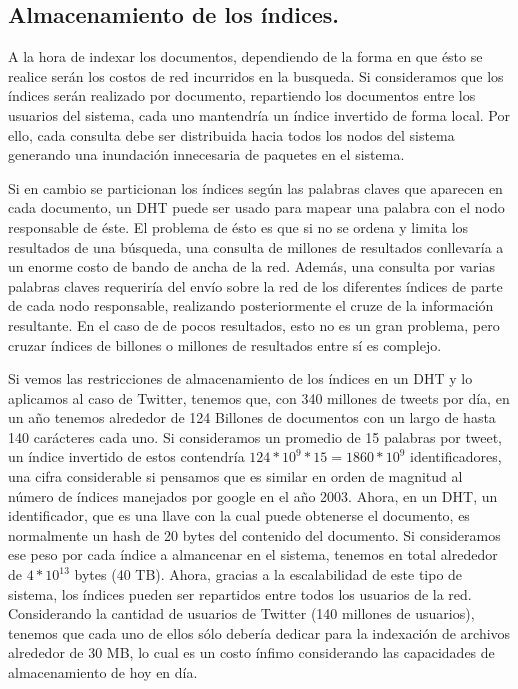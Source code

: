 %

\subsection{Almacenamiento de los índices.}
\label{sec:index_storage}
    

    A la hora de indexar los documentos, dependiendo de la forma en
    que ésto se realice serán los costos de red incurridos en la busqueda.
    Si consideramos que los índices serán realizado por documento, repartiendo
    los documentos entre los usuarios del sistema, cada uno mantendría un índice
    invertido de forma local. Por ello, cada consulta debe ser distribuida
    hacia todos los nodos del sistema generando una inundación innecesaria de paquetes en el sistema.
    
    Si en cambio se particionan los índices según las palabras claves que
    aparecen en cada documento, un DHT puede ser usado para mapear una palabra
    con el nodo responsable de éste.
    El problema de ésto es que si no se ordena y limita los resultados de una búsqueda, una consulta de millones de resultados conllevaría a un enorme
    costo de bando de ancha de la red. Además, una consulta por varias palabras
    claves requeriría del envío sobre la red de los diferentes índices de parte
    de cada nodo responsable, realizando posteriormente el cruze  de la
    información resultante. En el caso de de pocos resultados, esto no es un
    gran problema, pero cruzar índices de billones o millones de resultados entre
    sí es complejo.

    Si vemos las restricciones de almacenamiento de los índices en un DHT y lo
    aplicamos al caso de Twitter, tenemos que, con
    340 millones de tweets por día, en un año tenemos alrededor de 124 Billones de
    documentos con un largo de hasta 140 carácteres cada uno. Si consideramos
    un promedio de 15 palabras por tweet, un índice invertido de estos
    contendría $124 * 10^9 * 15 = 1860 * 10^9$ identificadores, una cifra
    considerable si pensamos que es similar en orden de magnitud al número de
    índices manejados por google en el año 2003.
    Ahora, en un DHT, un identificador, que es una llave con la cual puede
    obtenerse el documento, es normalmente un hash de 20 bytes del contenido del
    documento.
    Si consideramos ese peso por cada índice a almancenar en el sistema,
    tenemos en total alrededor de $4 * 10^{13}$  bytes (40 TB). Ahora, gracias
    a la escalabilidad de este tipo de sistema, los índices pueden ser repartidos
    entre todos los usuarios de la red. Considerando la cantidad de usuarios de
    Twitter (140 millones de usuarios), tenemos que cada uno de ellos sólo
    debería dedicar para la indexación de archivos  alrededor de 30 MB, lo cual
    es un costo ínfimo considerando las capacidades de almacenamiento de hoy en
    día.


